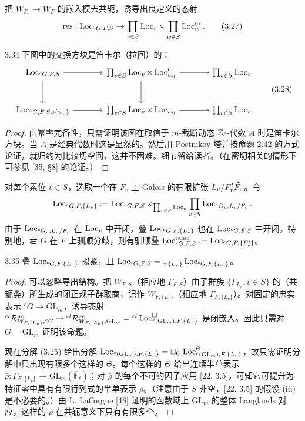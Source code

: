 把 $W_{F_v}\to W_F$ 的嵌入模去共轭，诱导出良定义的态射
\begin{equation}
\mathrm{res}:\operatorname{Loc}_{{}^{c}G,F,S}\to\prod_{v\in S}\operatorname{Loc}_v\times\prod_{w\notin S}\operatorname{Loc}^{\mathrm{ur}}_{w}. \tag{3.27}
\end{equation}
\begin{lem}{3.34}
下图中的交换方块是笛卡尔（拉回）的：
\begin{equation}
\begin{tikzcd}[column sep=large,row sep=large]
\Loc_{{}^{c}G,F,S} \arrow[r] \arrow[d] & \prod_{v\in S}\Loc_v\times\Loc^{\mathrm{ur}}_{w_0} \arrow[r] \arrow[d] & \prod_{v\in S}\Loc_v \\
\Loc_{{}^{c}G,F,S\cup\{w_0\}} \arrow[r] & \prod_{v\in S}\Loc_v\times\Loc_{w_0} \arrow[r] & \prod_{v\in S}\Loc_v
\end{tikzcd} \tag{3.28}
\end{equation}
\end{lem}
\begin{proof}
由幂零完备性，只需证明该图在取值于 $m$-截断动态 $\mathbb{Z}_{\ell}$-代数 $A$ 时是笛卡尔方块。当 $A$ 是经典代数时这是显然的。然后用 Postnikov 塔并按命题 2.42 的方式论证，就归约为比较切空间，这并不困难。细节留给读者。（在密切相关的情形下可参见 [35, §8] 的论证。）
\end{proof}

对每个素位 $v\in S$，选取一个在 $F_v$ 上 Galois 的有限扩张 $L_v/F^{t}_v\widetilde F_v$。令
\[
\operatorname{Loc}_{{}^{c}G,F,\{L_v\}}:=\operatorname{Loc}_{{}^{c}G,F,S}\times_{\prod_{v\in S}\operatorname{Loc}_v}\prod_{v\in S}\operatorname{Loc}_{{}^{c}G_v,L_v/F_v}.
\]
由于 $\operatorname{Loc}_{{}^{c}G_v,L_v/F_v}$ 在 $\operatorname{Loc}_v$ 中开闭，叠 $\operatorname{Loc}_{{}^{c}G,F,\{L_v\}}$ 也在 $\operatorname{Loc}_{{}^{c}G,F,S}$ 中开闭。特别地，若 $G$ 在 $F$ 上驯顺分歧，则有驯顺叠 $\operatorname{Loc}^{\mathrm{tame}}_{{}^{c}G,F,S}:=\operatorname{Loc}_{{}^{c}G,F,\{F^{t}_v\}}$。
\begin{prop}{3.35}
叠 $\operatorname{Loc}_{{}^{c}G,F,\{L_v\}}$ 拟紧，且 $\operatorname{Loc}_{{}^{c}G,F,S}=\cup_{\{L_v\}}\operatorname{Loc}_{{}^{c}G,F,\{L_v\}}$。
\end{prop}
\begin{proof}
可以忽略导出结构。把 $W_{F,S}$（相应地 $\Gamma_{F,S}$）由子群族 $\{\Gamma_{L_v},v\in S\}$ 的（共轭类）所生成的闭正规子群取商，记作 $W_{F,\{L_v\}}$（相应地 $\Gamma_{F,\{L_v\}}$）。对固定的忠实表示 ${}^cG\to\mathrm{GL}_m$，诱导态射 ${}^{cl}\mathcal R^{sc}_{W_{F,\{L_v\}},{}^{c}G}\to{}^{cl}\mathcal R^{sc}_{W_{F,\{L_v\}},\mathrm{GL}_m}={}^{cl}\operatorname{Loc}^{\square}_{{}^{c}(\mathrm{GL}_m),F,\{L_v\}}$ 是闭嵌入。因此只需对 $G=\mathrm{GL}_m$ 证明该命题。

现在分解 (3.25) 给出分解 $\operatorname{Loc}_{{}^{c}(\mathrm{GL}_m),F,\{L_v\}}=\sqcup_{\Theta}\operatorname{Loc}^{\Theta}_{{}^{c}(\mathrm{GL}_m),F,\{L_v\}}$，故只需证明分解中只出现有限多个这样的 $\Theta$。每个这样的 $\Theta$ 给出连续半单表示 $\bar\rho:\Gamma_{F,\{L_v\}}\to\mathrm{GL}_m(\overline{\mathbb F}_{\ell})$；对 $\bar\rho$ 的每个不可约因子应用 [22, 3.5]，可知它可提升为特征零中具有有限行列式的半单表示 $\rho$。（注意由于 $S$ 非空，[22, 3.5] 的假设 (iii) 是不必要的。）由 L. Lafforgue [48] 证明的函数域上 $\mathrm{GL}_m$ 的整体 Langlands 对应，这样的 $\rho$ 在共轭意义下只有有限多个。
\end{proof}

